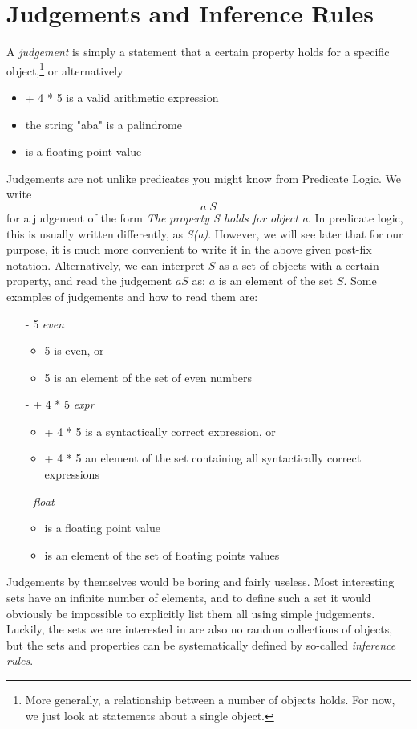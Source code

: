 \documentclass{book}
\begin{document}
\section{Judgements and Inference Rules}
A \emph{judgement} is simply a statement that a certain property holds for a
specific object,\footnote{More generally, a relationship between a number of
  objects holds. For now, we just look at statements about a single object.} or alternatively 
\begin{itemize}
\item {} + 4 * 5\> is a valid arithmetic expression
\item the string \<"aba"\> is a palindrome
\item {}\> is a floating point value
\end{itemize}
Judgements are not unlike  predicates you might know from Predicate Logic. We
write \[ a\; S \]
for a judgement of the form \textit{The property S holds for object a}. In
predicate logic, this is usually written differently, as
\textit{S(a)}. However, we will see later that for our purpose, it is much
more convenient to write it in the above given post-fix
notation.  Alternatively, we can interpret $S$ as a set of objects with a
certain property, and read the judgement $a S$ as: $a$ is an element of the set
$S$. Some examples of judgements and how to read them are:
\begin{itemize}

  \item[-] 5 \textit{even}
    \begin{itemize}   
    \item 5 is even, or 
    \item 5 is an element of the set of even numbers
    \end{itemize}
    
  \item[-]  + 4 * 5\>  \textit{expr}
    \begin{itemize}   
    \item {} + 4 * 5\> is a syntactically correct expression, or
    \item {} + 4 * 5\> an element of the set containing all syntactically correct expressions
    \end{itemize}

 \item[-] \>  \textit{float}
    \begin{itemize}  
      \item {}\> is a floating point value
      \item {}\> is an element of the set of floating points values
    \end{itemize}
  \end{itemize}
Judgements by themselves would be boring and fairly useless. Most
interesting sets have an infinite number of elements, and to define such a set
it would obviously be impossible to explicitly list them all using simple
judgements. Luckily, the sets we are interested in are also no random
collections of objects, but the sets and properties can be systematically
defined by so-called \emph{inference rules}.
\end{document}
